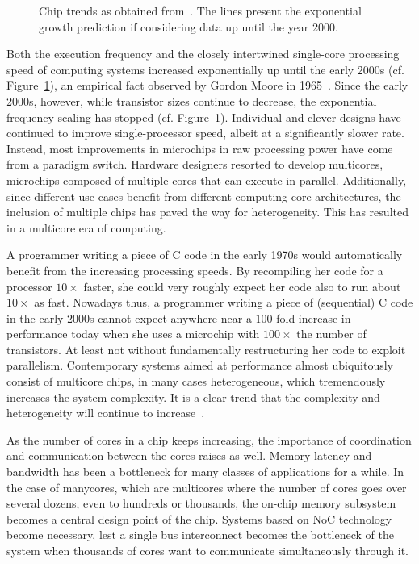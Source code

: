 \begin{figure}[h]
	\centering
   \resizebox{0.9\textwidth}{!}{}
   \caption{Chip trends as obtained from~\cite{microprocessordata}. The lines present the exponential growth prediction if considering data up until the year 2000.}
	\label{fig:multicore_era}
\end{figure}


Both the execution frequency and the closely intertwined single-core processing speed of computing systems increased exponentially up until the early 2000s (cf. Figure~\ref{fig:multicore_era}), an empirical fact observed by Gordon Moore in 1965~\cite{moore}.
Since the early 2000s, however, while transistor sizes continue to decrease, the exponential frequency scaling has stopped (cf. Figure~\ref{fig:multicore_era}).
Individual and clever designs have continued to improve single-processor speed, albeit at a significantly slower rate.
Instead, most improvements in microchips in raw processing power have come from a paradigm switch.
Hardware designers resorted to develop multicores, microchips composed of multiple cores that can execute in parallel.
Additionally, since different use-cases benefit from different computing core architectures, the inclusion of multiple chips has paved the way for heterogeneity.
This has resulted in a multicore era of computing.

A programmer writing a piece of C code in the early 1970s would automatically benefit from the increasing processing speeds.
By recompiling her code for a processor $10 \times$ faster, she could very roughly expect her code also to run about $10 \times$ as fast.%
Nowadays thus, a programmer writing a piece of (sequential) C code in the early 2000s cannot expect anywhere near a $100$-fold increase in performance today when she uses a microchip with $100 \times$ the number of transistors.
At least not without fundamentally restructuring her code to exploit parallelism.
Contemporary systems aimed at performance almost ubiquitously consist of multicore chips, in many cases heterogeneous, which tremendously increases the system complexity.
It is a clear trend that the complexity and heterogeneity will continue to increase~\cite{voelp16_pmes}.

As the number of cores in a chip keeps increasing, the importance of coordination and communication between the cores raises as well.
Memory latency and bandwidth has been a bottleneck for many classes of applications for a while.
In the case of manycores, which are multicores where the number of cores goes over several dozens, even to hundreds or thousands, the on-chip memory subsystem becomes a central design point of the chip.
Systems based on \ac{NoC} technology become necessary, lest a single bus interconnect becomes the bottleneck of the system when thousands of cores want to communicate simultaneously through it.


